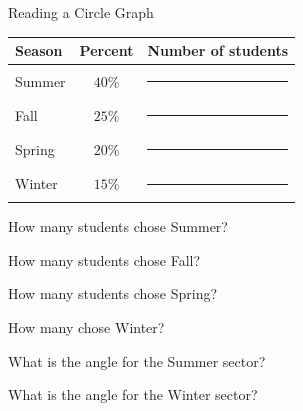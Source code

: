 \begin{practiceBox}{Reading a Circle Graph}


\begin{center}
\begin{tabular}{lcc}
    \textbf{Season} & \textbf{Percent} & \textbf{Number of students} \\
    \hline
    Summer  & $40\%$ & \rule{2cm}{0.4pt} \\
    Fall    & $25\%$ & \rule{2cm}{0.4pt} \\
    Spring  & $20\%$ & \rule{2cm}{0.4pt} \\
    Winter  & $15\%$ & \rule{2cm}{0.4pt} \\
\end{tabular}
\end{center}

\prob How many students chose Summer? \answerBlank[3cm]

\prob How many students chose Fall? \answerBlank[3cm]

\prob How many students chose Spring? \answerBlank[3cm]

\prob How many chose Winter? \answerBlank[3cm]

\prob What is the angle for the Summer sector? \answerBlank[3cm]

\prob What is the angle for the Winter sector? \answerBlank[3cm]

\end{practiceBox}

